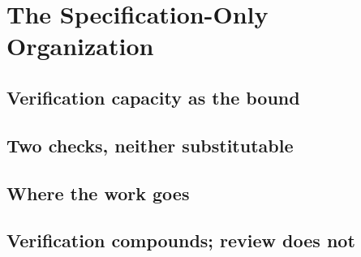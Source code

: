 \section{The Specification-Only Organization}
\label{sec:thesis}



\subsection{Verification capacity as the bound}

\subsection{Two checks, neither substitutable}

\subsection{Where the work goes}

\subsection{Verification compounds; review does not}

